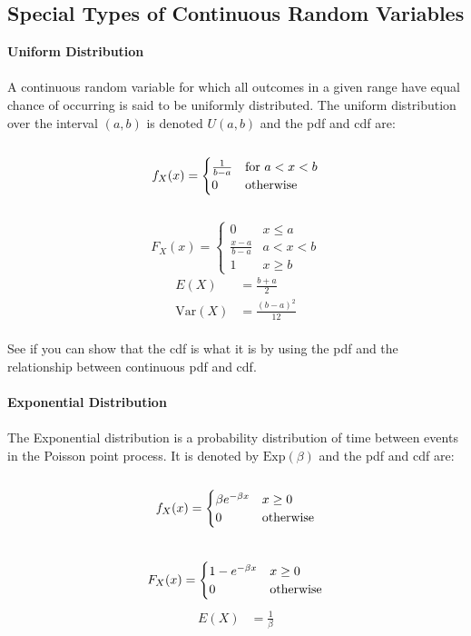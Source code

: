 \documentclass[,oneside]{article}
\begin{document}
\begin{enumerate}
\subsection{Special Types of Continuous Random Variables}
\textbf{Uniform Distribution}\\ \\
A continuous random variable for which all outcomes in a given range have equal chance of occurring is said to be uniformly distributed. The uniform distribution over the interval $(a, b)$ is denoted $U(a,b)$ and the pdf and cdf are:\\ \\
\[
f_X(x)=
\begin{cases}
 \frac{1}{b-a} & \text{for }  a < x < b \\
0 & $otherwise$
\end{cases} \] \\
\[
F_X(x)=
\begin{cases}
0 & x \leq a \\
 \frac{x-a}{b-a} & a < x < b \\
1 & x \geq b
\end{cases} \] 
\begin{align*}
E(X)&=\frac{b+a}{2}\\
\text{Var}(X)&=\frac{(b-a)^2}{12}
\end{align*}\\
See if you can show that the cdf is what it is by using the pdf and the relationship between continuous pdf and cdf.\\ \\
\textbf{Exponential Distribution}\\ \\
The Exponential distribution is a probability distribution of time between events in the Poisson point process. It is denoted by $\text{Exp}(\beta)$ and the pdf and cdf are:\\ \\
\[
f_X(x)=
\begin{cases}
\beta e^{-\beta x} &  x \geq 0 \\
0 & $otherwise$
\end{cases} \] \\
\[
F_X(x)=
\begin{cases}
1-e^{-\beta x} &  x \geq 0\\
0 & $otherwise$
\end{cases} \] 
\begin{align*}
E(X)&=\frac{1}{\beta}\\
\end{align*}\\ \\

\end{enumerate}
\end{document}
